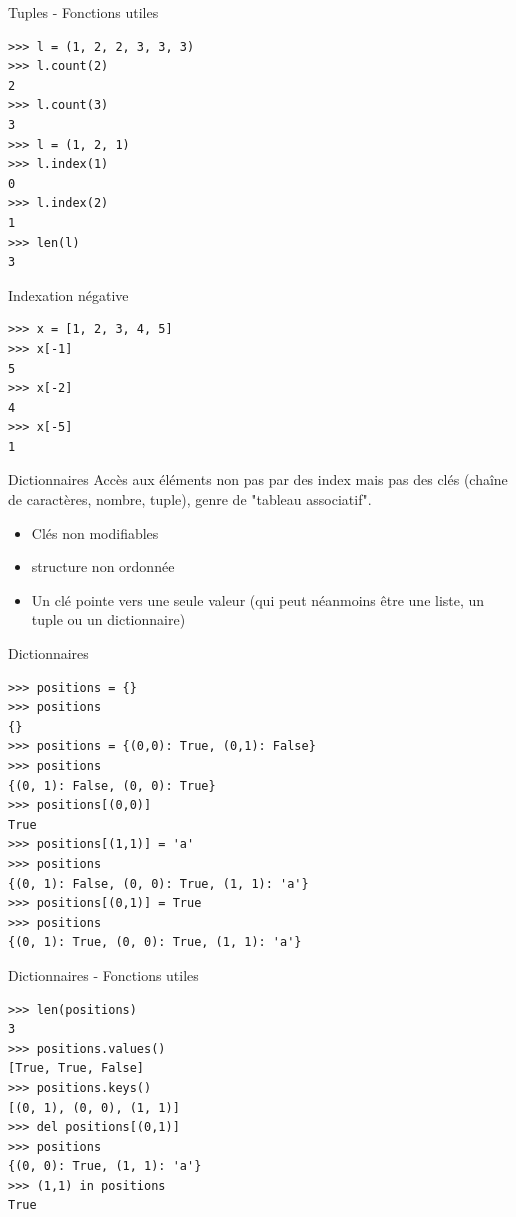 \documentclass{beamer}
\begin{document}
\begin{frame}[fragile]{Tuples - Fonctions utiles}
\begin{lstlisting}[multicols=2]
>>> l = (1, 2, 2, 3, 3, 3)
>>> l.count(2)
2
>>> l.count(3)
3
>>> l = (1, 2, 1)
>>> l.index(1)
0
>>> l.index(2)
1
>>> len(l)
3
\end{lstlisting}
\end{frame}

\begin{frame}[fragile]{Indexation négative}
\begin{lstlisting}
>>> x = [1, 2, 3, 4, 5]
>>> x[-1]
5
>>> x[-2]
4
>>> x[-5]
1
\end{lstlisting}
\end{frame}



\begin{frame}[fragile]{Dictionnaires}
Accès aux éléments non pas par des index mais pas des clés (chaîne de caractères, nombre, tuple), genre de "tableau associatif".\\
\begin{itemize}
 \item Clés non modifiables
 \item structure non ordonnée
 \item Un clé pointe vers une seule valeur (qui peut néanmoins être une liste, un tuple ou un dictionnaire)
\end{itemize}
\end{frame}

\begin{frame}[fragile]{Dictionnaires}
\begin{lstlisting}
>>> positions = {}
>>> positions
{}
>>> positions = {(0,0): True, (0,1): False}
>>> positions
{(0, 1): False, (0, 0): True}
>>> positions[(0,0)]
True
>>> positions[(1,1)] = 'a'
>>> positions
{(0, 1): False, (0, 0): True, (1, 1): 'a'}
>>> positions[(0,1)] = True
>>> positions
{(0, 1): True, (0, 0): True, (1, 1): 'a'}
\end{lstlisting}
\end{frame}


\begin{frame}[fragile]{Dictionnaires - Fonctions utiles}
\begin{lstlisting}
>>> len(positions)
3
>>> positions.values()
[True, True, False]
>>> positions.keys()
[(0, 1), (0, 0), (1, 1)]
>>> del positions[(0,1)]
>>> positions
{(0, 0): True, (1, 1): 'a'}
>>> (1,1) in positions
True
\end{lstlisting}
\end{frame}
\end{document}
